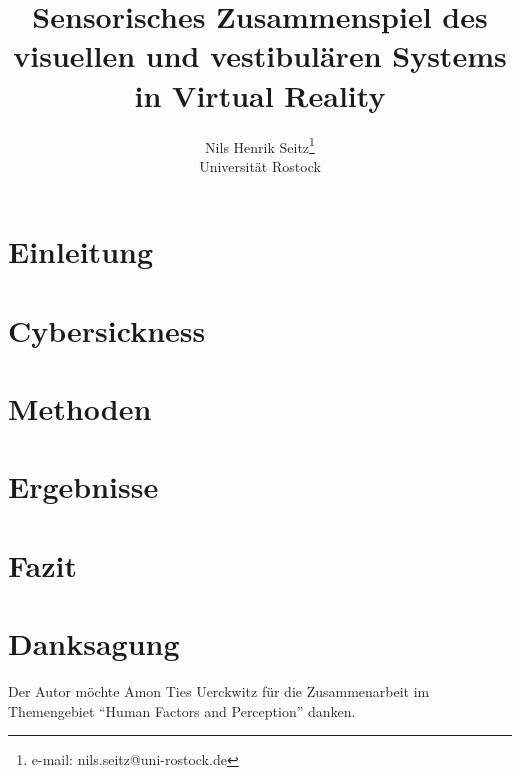 \documentclass[preprint]{vgtc}               %
\title{Sensorisches Zusammenspiel des visuellen und vestibul\"aren Systems in Virtual Reality}
\author{Nils Henrik Seitz\thanks{e-mail: nils.seitz@uni-rostock.de}\\ \scriptsize Universit\"at Rostock}
\begin{document}
\maketitle

\section{Einleitung} 
	

\section{Cybersickness}
	

\section{Methoden}
	

\section{Ergebnisse}
	

\section{Fazit}
	

\section*{Danksagung}{
	Der Autor m\"ochte Amon Ties Uerckwitz f\"ur die Zusammenarbeit im Themengebiet "`Human Factors and Perception"' danken.}



\end{document}
